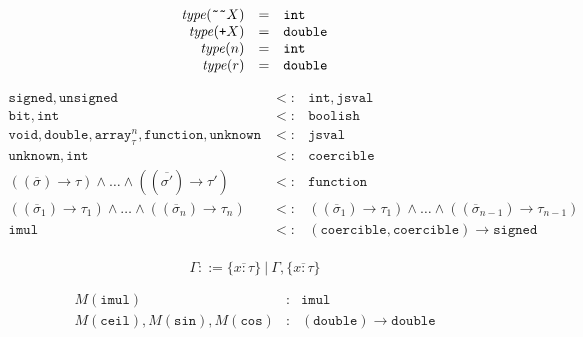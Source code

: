 \documentclass{article}
\newcommand{\type}{\mathit{type}}
\newcommand{\funty}[2]{({#1}) \rightarrow {#2}}
\newcommand{\seq}[1]{\overline{{#1}}}
\newcommand{\mathjs}[1]{\mbox{\texttt{{#1}}}}
\newcommand\defeq{\stackrel{\mbox{\tiny def}}{=}}
\newcommand{\bit}{\mathtt{bit}}
\newcommand{\unsigned}{\mathtt{unsigned}}
\newcommand{\signed}{\mathtt{signed}}
\newcommand{\double}{\mathtt{double}}
\newcommand{\arr}[2]{\mathtt{array}^{#1}_{#2}}
\newcommand{\jsval}{\mathtt{jsval}}
\newcommand{\unk}{\mathtt{unknown}}
\newcommand{\void}{\mathtt{void}}
\newcommand{\tobits}[1]{\mathjs{\~{}\~{}}{#1}}
\newcommand{\tofloat}[1]{\mathjs{+}{#1}}
\renewcommand{\int}{\mathtt{int}}
\newcommand{\function}{\mathtt{function}}
\newcommand{\union}[2]{{#1}\mathrel{|}{#2}}
\newcommand{\boolish}{\mathtt{boolish}}
\newcommand{\imul}{\mathtt{imul}}
\newcommand{\coercible}{\mathtt{coercible}}
\begin{document}
\[
\begin{array}{rcl}
\type(\tobits{X})  & = & \int \\
\type(\tofloat{X}) & = & \double \\
\type(n)           & = & \int \\
\type(r)           & = & \double \\
\end{array}
\]


\[
\begin{array}{rcl}
\signed, \unsigned                                                                  & <: & \int, \jsval \\
\bit, \int                                                                          & <: & \boolish \\
\void, \double, \arr{n}{\tau}, \function, \unk                                      & <: & \jsval \\
\unk, \int                                                                          & <: & \coercible \\
(\funty{\seq{\sigma}}{\tau}) \land \ldots \land (\funty{\seq{\sigma'}}{\tau'})      & <: & \function \\
(\funty{\seq{\sigma}_1}{\tau_1}) \land \ldots \land (\funty{\seq{\sigma}_n}{\tau_n}) & <: & (\funty{\seq{\sigma}_1}{\tau_1}) \land \ldots \land (\funty{\seq{\sigma}_{n-1}}{\tau_{n-1}}) \\
\imul                                                                               & <: & \funty{\coercible, \coercible}{\signed} \\
\end{array}
\]



\[
\Gamma ::= \{ \seq{x : \tau} \} ~|~ \Gamma, \{ \seq{x : \tau} \}
\]

\[
\begin{array}{rcl}
M(\imul) & : & \imul \\
M(\mathtt{ceil}), M(\mathtt{sin}), M(\mathtt{cos}) & : & \funty{\double}{\double} \\
\end{array}
\]
\end{document}
